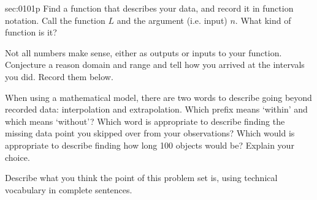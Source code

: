 \begin{multicols*}{2}
\begin{exercises}{sec:0101p}
\lab{} Find a \gls{function} that describes your data, and record it in \gls{function notation}.
Call the function $L$ and the argument (i.e. input) $n$.  What kind of function is it?

\vspace{3cm}
\lab{} Not all numbers make sense, either as outputs or inputs to your function.  Conjecture
a reason \gls{domain} and \gls{range} and tell how you arrived at the intervals you did.
Record them below.

\vspace{3cm}
\lab{} When using a \gls{mathematical model}, there are two words to describe going beyond
recorded data:  \gls{interpolation} and \gls{extrapolation}.  
Which prefix means `within' and which means
`without'?  Which word is appropriate to describe finding the missing data point you skipped over from
your observations?  Which would is appropriate to describe finding how long 100 objects 
would be?  Explain your choice.

\vspace{4cm}
\lab{} Describe what you think the point of this problem set is, using technical vocabulary in complete
sentences.
\end{exercises}
\end{multicols*}